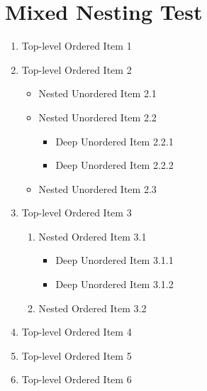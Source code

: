 \section{Mixed Nesting Test}

\begin{enumerate}
  \item Top-level Ordered Item 1
  \item Top-level Ordered Item 2
    \begin{itemize}
      \item Nested Unordered Item 2.1
      \item Nested Unordered Item 2.2
        \begin{itemize}
          \item Deep Unordered Item 2.2.1
          \item Deep Unordered Item 2.2.2
        \end{itemize}
      \item Nested Unordered Item 2.3
    \end{itemize}
  \item Top-level Ordered Item 3
    \begin{enumerate}
      \item Nested Ordered Item 3.1
        \begin{itemize}
          \item Deep Unordered Item 3.1.1
          \item Deep Unordered Item 3.1.2
        \end{itemize}
      \item Nested Ordered Item 3.2
    \end{enumerate}
  \item Top-level Ordered Item 4
  \item Top-level Ordered Item 5
  \item Top-level Ordered Item 6
\end{enumerate}
